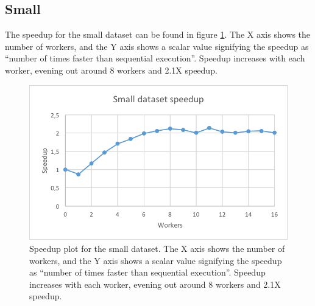 \subsection{Small}
The speedup for the small dataset can be found in figure \ref{fig:dataset_2_speedup}.
The X axis shows the number of workers, and the Y axis shows a scalar value signifying the speedup as
``number of times faster than sequential execution''. Speedup increases with each worker, evening out around 8 workers and 2.1X speedup.
\begin{figure}[ht]
  \centering
  \includegraphics[width=120mm]{figures/dataset_2/dataset_2_speedup.png}
  \caption[Speedup plot for the small dataset.]{Speedup plot for the small dataset. The X axis shows the number of workers, and the Y axis shows a scalar value signifying the speedup as
  ``number of times faster than sequential execution''. Speedup increases with each worker, evening out around 8 workers and 2.1X speedup.}
  \label{fig:dataset_2_speedup}
\end{figure}

